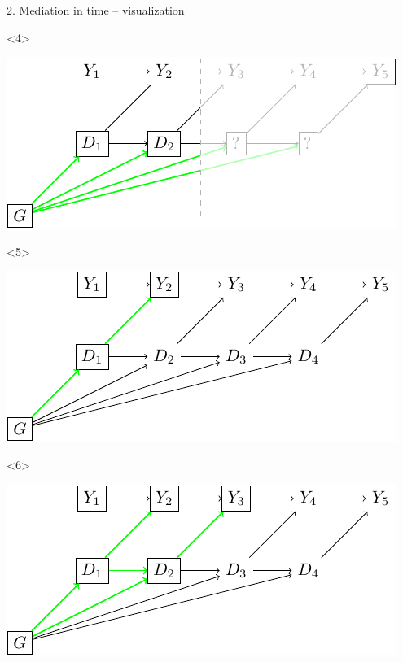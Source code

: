 \documentclass{beamer}\usepackage{listings}
\begin{document}
\begin{frame}[label={sec:org8730378}]{2. Mediation in time -- visualization}
\begin{onlyenv}<4>
\begin{center}
\includegraphics[width=.9\linewidth]{./figs/med-long2.pdf}
\end{center}
\end{onlyenv}

\begin{onlyenv}<5>
\begin{center}
\includegraphics[width=.9\linewidth]{./figs/med-li1.pdf}
\end{center}
\end{onlyenv}

\begin{onlyenv}<6>
\begin{center}
\includegraphics[width=.9\linewidth]{./figs/med-li2.pdf}
\end{center}
\end{onlyenv}


\end{frame}
\end{document}
